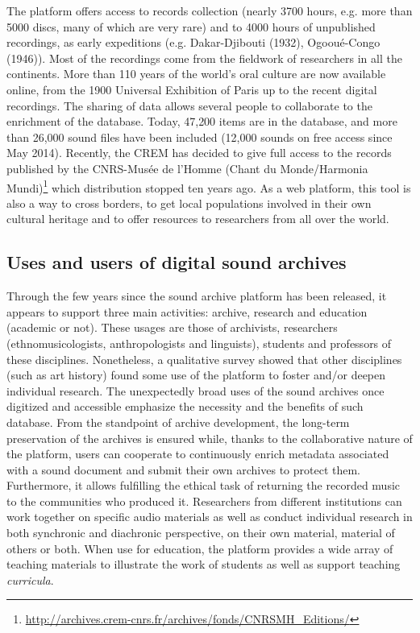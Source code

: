 \documentclass{sig-alternate}
\begin{document}
The platform offers access to records collection (nearly 3700 hours, e.g. more than 5000 discs, many of which are very rare) and to 4000 hours of unpublished recordings, as early expeditions (e.g. Dakar-Djibouti (1932), Ogooué-Congo (1946)). Most of the recordings come from the fieldwork of researchers in all the continents. 
More than 110 years of the world's oral culture are now available online, from the 1900 Universal Exhibition of Paris up to the recent digital recordings. The sharing of data allows several people to collaborate to the enrichment of the database. Today, 47,200 items are in the database, and more than 26,000 sound files have been included (12,000 sounds on free access since May 2014). Recently, the CREM has decided to give full access to the records published by the CNRS-Musée de l’Homme (Chant du Monde/Harmonia Mundi)\footnote{\url{http://archives.crem-cnrs.fr/archives/fonds/CNRSMH_Editions/}} which distribution stopped ten years ago.
As a web platform, this tool is also a way to cross borders, to get local populations involved in their own cultural heritage and to offer resources to researchers from all over the world.

\subsection{Uses and users of digital sound archives}
     Through the few years since the sound archive platform has been released, it appears to support three main activities: archive, research and education (academic or not). These usages are those of archivists, researchers (ethnomusicologists, anthropologists and linguists), students and professors of these disciplines. Nonetheless, a qualitative survey showed that other disciplines (such as art history) found some use of the platform to foster and/or deepen individual research. The unexpectedly broad uses of the sound archives once digitized and accessible emphasize the necessity and the benefits of such database.
From the standpoint of archive development, the long-term preservation of the archives is ensured while, thanks to the collaborative nature of the platform, users can cooperate to continuously enrich metadata associated with a sound document and submit their own archives to protect them. Furthermore, it allows fulfilling the ethical task of returning the recorded music to the communities who produced it.
Researchers from different institutions can work together on specific audio materials as well as conduct individual research in both synchronic and diachronic perspective, on their own material, material of others or both.
When use for education, the platform provides a wide array of teaching materials to illustrate the work of students as well as support teaching \emph{curricula}.
\end{document}
